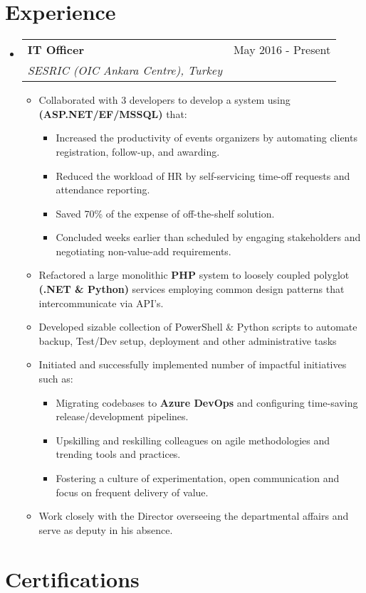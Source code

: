 \documentclass[letterpaper,11pt]{article}
\makeatletter
\newcommand{\sectionStart}{
  \begin{itemize}[label={},leftmargin=0in]
}
\newcommand{\sectionEnd}{
  \end{itemize}
}
\newcommand{\jobHeading}[3]{
  \vspace{-1pt}
  \item
  \begin{tabular*}{1.0\textwidth}{l@{\extracolsep{\fill}}r@{}}
    \normalsize{\textbf{#1}} & #2 \\
    \textit{\small#3} \\
  \end{tabular*}\vspace{-5pt}
}
\newcommand{\listStart}{\begin{itemize}}
\newcommand{\listEnd}{\end{itemize}\vspace{-5pt}}
\newcommand{\bulletItem}[1]{
  \item
  \small{
    {#1 \vspace{-1.8pt}}
  }
}
\makeatother
\begin{document}
\section{Experience}
\sectionStart
  \jobHeading
    {IT Officer}
    {May 2016 - Present}
    {SESRIC (OIC Ankara Centre), Turkey}
  \listStart
  \bulletItem
  {
Collaborated with 3 developers to develop a system using \textbf{(ASP.NET/EF/MSSQL)} that:
\begin{itemize}
\item  Increased the productivity of events organizers by automating clients registration, follow-up, and awarding.
\item Reduced the workload of HR by self-servicing time-off requests and attendance reporting.
\item Saved 70\% of the expense of off-the-shelf solution.
\item Concluded weeks earlier than scheduled by engaging stakeholders and negotiating non-value-add requirements.  
\end{itemize}

  }
    \bulletItem
    {Refactored a large monolithic \textbf{PHP} system to loosely coupled polyglot  \textbf{(.NET \& Python)} services employing common design patterns that intercommunicate via API's.}
    \bulletItem
    {Developed sizable collection of PowerShell \& Python scripts to automate backup, Test/Dev setup, deployment and other administrative tasks}
    \bulletItem
    {Initiated and successfully implemented number of impactful initiatives such as:  
    \begin{itemize}
    \item Migrating codebases to \textbf{Azure DevOps} and configuring time-saving release/development pipelines.
    \item Upskilling and reskilling colleagues on agile methodologies and trending tools and practices.
    \item Fostering a culture of experimentation, open communication and focus on frequent delivery of value. 
    \end{itemize}
        
    }
    \bulletItem
    {Work closely with the Director overseeing the departmental affairs and serve as  deputy in his absence. }
  \listEnd
\sectionEnd

\section{Certifications}
\end{document}
